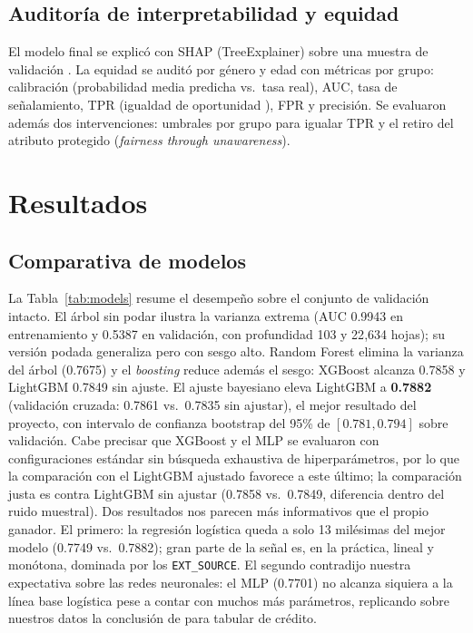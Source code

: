 \documentclass[journal]{IEEEtran}
\begin{document}
\subsection{Auditoría de interpretabilidad y equidad}

El modelo final se explicó con SHAP (TreeExplainer) sobre una muestra de validación \cite{lundberg2017}. La equidad se auditó por género y edad con métricas por grupo: calibración (probabilidad media predicha vs.\ tasa real), AUC, tasa de señalamiento, TPR (igualdad de oportunidad \cite{hardt2016}), FPR y precisión. Se evaluaron además dos intervenciones: umbrales por grupo para igualar TPR \cite{hardt2016} y el retiro del atributo protegido (\textit{fairness through unawareness}).

\section{Resultados}

\subsection{Comparativa de modelos}

La Tabla~\ref{tab:models} resume el desempeño sobre el conjunto de validación intacto. El árbol sin podar ilustra la varianza extrema (AUC 0.9943 en entrenamiento y 0.5387 en validación, con profundidad 103 y 22{,}634 hojas); su versión podada generaliza pero con sesgo alto. Random Forest elimina la varianza del árbol (0.7675) y el \textit{boosting} reduce además el sesgo: XGBoost alcanza 0.7858 y LightGBM 0.7849 sin ajuste. El ajuste bayesiano eleva LightGBM a \textbf{0.7882} (validación cruzada: 0.7861 vs.\ 0.7835 sin ajustar), el mejor resultado del proyecto, con intervalo de confianza bootstrap del 95\% de $[0.781, 0.794]$ sobre validación. Cabe precisar que XGBoost y el MLP se evaluaron con configuraciones estándar sin búsqueda exhaustiva de hiperparámetros, por lo que la comparación con el LightGBM ajustado favorece a este último; la comparación justa es contra LightGBM sin ajustar (0.7858 vs.\ 0.7849, diferencia dentro del ruido muestral). Dos resultados nos parecen más informativos que el propio ganador. El primero: la regresión logística queda a solo 13 milésimas del mejor modelo (0.7749 vs.\ 0.7882); gran parte de la señal es, en la práctica, lineal y monótona, dominada por los \texttt{EXT\_SOURCE}. El segundo contradijo nuestra expectativa sobre las redes neuronales: el MLP (0.7701) no alcanza siquiera a la línea base logística pese a contar con muchos más parámetros, replicando sobre nuestros datos la conclusión de \cite{gunnarsson2021} para tabular de crédito.
\end{document}
